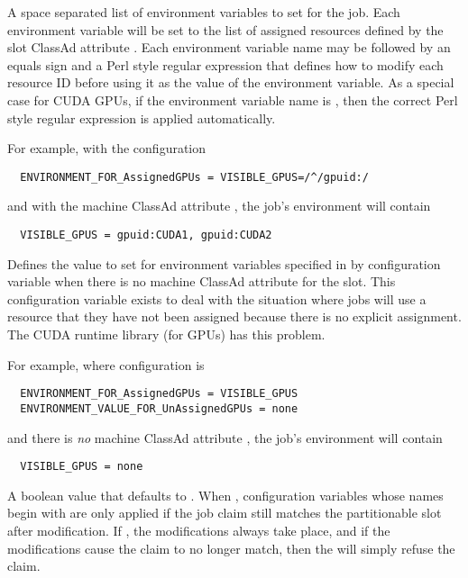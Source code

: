 \begin{description}
\label{param:EnvironmentForAssignedName}
\item[\Macro{ENVIRONMENT\_FOR\_Assigned<name>}]
  A space separated list of environment variables to set for the job.
  Each environment variable will be set to the list of assigned resources 
  defined by the slot ClassAd attribute .
  Each environment variable name may be followed by an equals sign
  and a Perl style regular expression that defines how to modify each 
  resource ID before using it as the value of the environment variable.  
  As a special case for CUDA GPUs,
  if the environment variable name is , 
  then the correct Perl style regular expression is applied automatically. 

  For example, with the configuration
\begin{verbatim}
  ENVIRONMENT_FOR_AssignedGPUs = VISIBLE_GPUS=/^/gpuid:/ 
\end{verbatim}

  and with the machine ClassAd attribute
  , 
  the job's environment will contain

\begin{verbatim}
  VISIBLE_GPUS = gpuid:CUDA1, gpuid:CUDA2 
\end{verbatim}

\label{param:EnvironmentValueForUnassignedName}
\item[\Macro{ENVIRONMENT\_VALUE\_FOR\_UnAssigned<name>}]
  Defines the value to set for environment variables specified
  in by configuration variable 
  when there is no machine ClassAd attribute  
  for the slot. 
  This configuration variable exists to deal with the situation where 
  jobs will use a resource that they have not been assigned because
  there is no explicit assignment.  
  The CUDA runtime library (for GPUs) has this problem.

  For example, where configuration is
\begin{verbatim}
  ENVIRONMENT_FOR_AssignedGPUs = VISIBLE_GPUS
  ENVIRONMENT_VALUE_FOR_UnAssignedGPUs = none 
\end{verbatim}
  and there is \emph{no} machine ClassAd attribute ,
  the job's environment will contain
\begin{verbatim}
  VISIBLE_GPUS = none
\end{verbatim}

\label{param:MustModifyRequestExprs}
\item[\Macro{MUST\_MODIFY\_REQUEST\_EXPRS}]
  A boolean value that defaults to .
  When ,
  configuration variables whose names begin with 
   are only applied if the job claim 
  still matches the partitionable slot after modification.
  If ,
  the modifications always take place, 
  and if the modifications cause the claim to no longer match, 
  then the  will simply refuse the claim.


\end{description}
